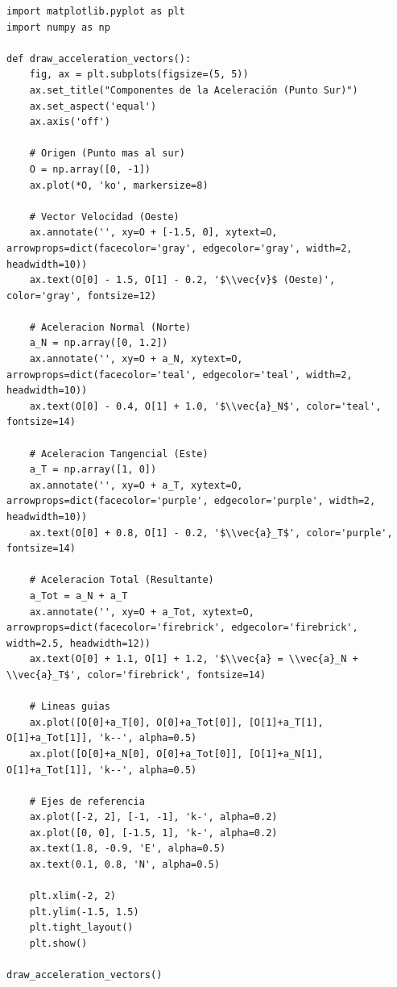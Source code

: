 \documentclass[12pt, a4paper]{article}
\begin{document}
\begin{lstlisting}
import matplotlib.pyplot as plt
import numpy as np

def draw_acceleration_vectors():
    fig, ax = plt.subplots(figsize=(5, 5))
    ax.set_title("Componentes de la Aceleración (Punto Sur)")
    ax.set_aspect('equal')
    ax.axis('off')
    
    # Origen (Punto mas al sur)
    O = np.array([0, -1])
    ax.plot(*O, 'ko', markersize=8)
    
    # Vector Velocidad (Oeste)
    ax.annotate('', xy=O + [-1.5, 0], xytext=O, arrowprops=dict(facecolor='gray', edgecolor='gray', width=2, headwidth=10))
    ax.text(O[0] - 1.5, O[1] - 0.2, '$\\vec{v}$ (Oeste)', color='gray', fontsize=12)
    
    # Aceleracion Normal (Norte)
    a_N = np.array([0, 1.2])
    ax.annotate('', xy=O + a_N, xytext=O, arrowprops=dict(facecolor='teal', edgecolor='teal', width=2, headwidth=10))
    ax.text(O[0] - 0.4, O[1] + 1.0, '$\\vec{a}_N$', color='teal', fontsize=14)
    
    # Aceleracion Tangencial (Este)
    a_T = np.array([1, 0])
    ax.annotate('', xy=O + a_T, xytext=O, arrowprops=dict(facecolor='purple', edgecolor='purple', width=2, headwidth=10))
    ax.text(O[0] + 0.8, O[1] - 0.2, '$\\vec{a}_T$', color='purple', fontsize=14)
    
    # Aceleracion Total (Resultante)
    a_Tot = a_N + a_T
    ax.annotate('', xy=O + a_Tot, xytext=O, arrowprops=dict(facecolor='firebrick', edgecolor='firebrick', width=2.5, headwidth=12))
    ax.text(O[0] + 1.1, O[1] + 1.2, '$\\vec{a} = \\vec{a}_N + \\vec{a}_T$', color='firebrick', fontsize=14)
    
    # Lineas guias
    ax.plot([O[0]+a_T[0], O[0]+a_Tot[0]], [O[1]+a_T[1], O[1]+a_Tot[1]], 'k--', alpha=0.5)
    ax.plot([O[0]+a_N[0], O[0]+a_Tot[0]], [O[1]+a_N[1], O[1]+a_Tot[1]], 'k--', alpha=0.5)

    # Ejes de referencia
    ax.plot([-2, 2], [-1, -1], 'k-', alpha=0.2)
    ax.plot([0, 0], [-1.5, 1], 'k-', alpha=0.2)
    ax.text(1.8, -0.9, 'E', alpha=0.5)
    ax.text(0.1, 0.8, 'N', alpha=0.5)

    plt.xlim(-2, 2)
    plt.ylim(-1.5, 1.5)
    plt.tight_layout()
    plt.show()

draw_acceleration_vectors()
\end{lstlisting}
\end{document}
